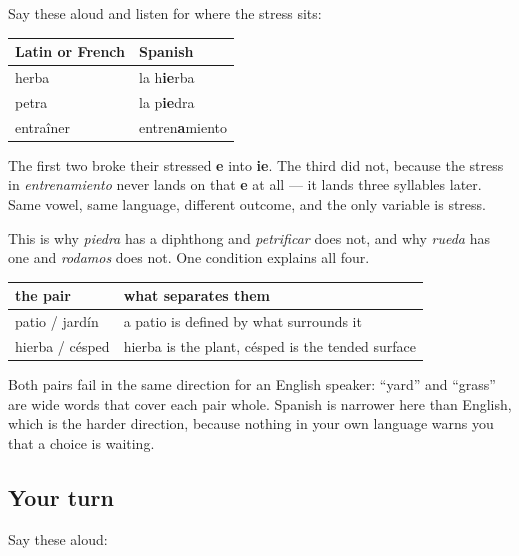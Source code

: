 \begin{grammarlens}[title={Grammar Lens: three words, one broken vowel}]
Say these aloud and listen for where the stress sits:

\noindent
\begin{tabularx}{\linewidth}{@{}>{\raggedright\arraybackslash}X>{\raggedright\arraybackslash}X@{}}
\toprule
\textbf{Latin or French} & \textbf{Spanish} \\
\midrule
herba & la h\textbf{ie}rba \\
petra & la p\textbf{ie}dra \\
entraîner & entren\textbf{a}miento \\
\bottomrule
\end{tabularx}

The first two broke their stressed \textbf{e} into \textbf{ie}. The third did not, because the stress in \emph{entrenamiento} never lands on that \textbf{e} at all — it lands three syllables later. Same vowel, same language, different outcome, and the only variable is stress.

This is why \emph{piedra} has a diphthong and \emph{petrificar} does not, and why \emph{rueda} has one and \emph{rodamos} does not. One condition explains all four.
\end{grammarlens}

\begin{grammarlens}[title={Grammar Lens: two pairs that are not synonyms}]
\noindent
\begin{tabularx}{\linewidth}{@{}>{\raggedright\arraybackslash}X>{\raggedright\arraybackslash}X@{}}
\toprule
\textbf{the pair} & \textbf{what separates them} \\
\midrule
patio / jardín & a patio is defined by what surrounds it \\
hierba / césped & hierba is the plant, césped is the tended surface \\
\bottomrule
\end{tabularx}

Both pairs fail in the same direction for an English speaker: \textquotedblleft{}yard\textquotedblright{} and \textquotedblleft{}grass\textquotedblright{} are wide words that cover each pair whole. Spanish is narrower here than English, which is the harder direction, because nothing in your own language warns you that a choice is waiting.
\end{grammarlens}

\subsection*{Your turn}
Say these aloud:

